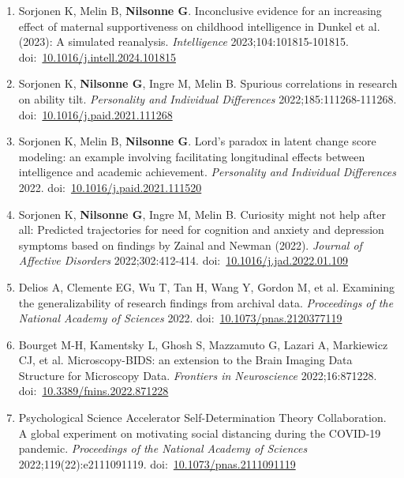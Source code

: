 \documentclass[11pt,a4paper]{article}
\begin{document}
\begin{enumerate}
\item Sorjonen K, Melin B, \textbf{Nilsonne G}. Inconclusive evidence for an increasing effect of maternal supportiveness on childhood intelligence in Dunkel et al. (2023): A simulated reanalysis. \textit{Intelligence} 2023;104:101815-101815. doi:~\href{https://doi.org/10.1016/j.intell.2024.101815}{10.1016/j.intell.2024.101815}

\item Sorjonen K, \textbf{Nilsonne G}, Ingre M, Melin B. Spurious correlations in research on ability tilt. \textit{Personality and Individual Differences} 2022;185:111268-111268. doi:~\href{https://doi.org/10.1016/j.paid.2021.111268}{10.1016/j.paid.2021.111268}

\item Sorjonen K, Melin B, \textbf{Nilsonne G}. Lord’s paradox in latent change score modeling: an example involving facilitating longitudinal effects between intelligence and academic achievement. \textit{Personality and Individual Differences} 2022. doi:~\href{https://doi.org/10.1016/j.paid.2021.111520}{10.1016/j.paid.2021.111520}

\item Sorjonen K, \textbf{Nilsonne G}, Ingre M, Melin B. Curiosity might not help after all: Predicted trajectories for need for cognition and anxiety and depression symptoms based on findings by Zainal and Newman (2022). \textit{Journal of Affective Disorders} 2022;302:412-414. doi:~\href{https://doi.org/10.1016/j.jad.2022.01.109}{10.1016/j.jad.2022.01.109}

\item Delios A, Clemente EG, Wu T, Tan H, Wang Y, Gordon M, et al. Examining the generalizability of research findings from archival data. \textit{Proceedings of the National Academy of Sciences} 2022. doi:~\href{https://doi.org/10.1073/pnas.2120377119}{10.1073/pnas.2120377119}

\item Bourget M-H, Kamentsky L, Ghosh S, Mazzamuto G, Lazari A, Markiewicz CJ, et al. Microscopy-BIDS: an extension to the Brain Imaging Data Structure for Microscopy Data. \textit{Frontiers in Neuroscience} 2022;16:871228. doi:~\href{https://doi.org/10.3389/fnins.2022.871228}{10.3389/fnins.2022.871228}

\item Psychological Science Accelerator Self-Determination Theory Collaboration. A global experiment on motivating social distancing during the COVID-19 pandemic. \textit{Proceedings of the National Academy of Sciences} 2022;119(22):e2111091119. doi:~\href{https://doi.org/10.1073/pnas.2111091119}{10.1073/pnas.2111091119}


\end{enumerate}
\end{document}
